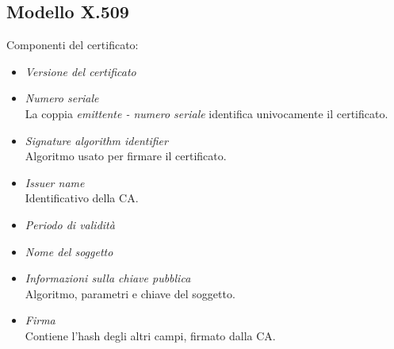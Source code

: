 \documentclass[a4paper, 11pt, twoside, openright, fleqn]{report}
\begin{document}
\subsection{Modello X.509}
\begin{minipage}[c]{.52\textwidth}
	Componenti del certificato:
	\begin{itemize}
		\item \emph{Versione del certificato}
		\item \emph{Numero seriale}\\
		La coppia \emph{emittente - numero seriale} identifica univocamente il certificato.
		\item \emph{Signature algorithm identifier}\\
		Algoritmo usato per firmare il certificato.
		\item \emph{Issuer name}\\
		Identificativo della CA.
		\item \emph{Periodo di validità}
		\item \emph{Nome del soggetto}
		\item \emph{Informazioni sulla chiave pubblica}\\
		Algoritmo, parametri e chiave del soggetto.
		\item \emph{Firma}\\
		Contiene l'hash degli altri campi, firmato dalla CA.
	\end{itemize}
\end{minipage}
\hfil
\end{document}
